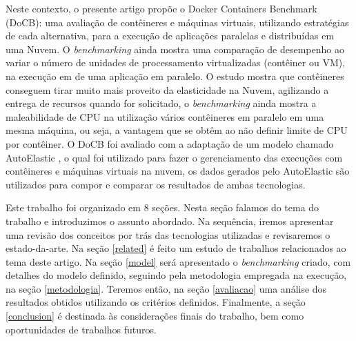 \documentclass[twoside,english,brazilian]{UNISINOSartigo}
\begin{document}

Neste contexto, o presente artigo propõe o Docker Containers Benchmark (DoCB): uma avaliação de contêineres e máquinas virtuais, utilizando estratégias de cada alternativa, para a execução de aplicações paralelas e distribuídas em uma Nuvem. O \textit{benchmarking} ainda mostra uma comparação de desempenho ao variar o número de unidades de processamento virtualizadas (contêiner ou VM), na execução em de uma aplicação em paralelo. O estudo mostra que contêineres conseguem tirar muito mais proveito da elasticidade na Nuvem, agilizando a entrega de recursos quando for solicitado, o \textit{benchmarking} ainda mostra a maleabilidade de CPU na utilização vários contêineres em paralelo em uma mesma máquina, ou seja, a vantagem que se obtêm ao não definir limite de CPU por contêiner. O DoCB foi avaliado com a adaptação de um modelo chamado AutoElastic , o qual foi utilizado para fazer o gerenciamento das execuções com contêineres e máquinas virtuais na nuvem, os dados gerados pelo AutoElastic são utilizados para compor e comparar os resultados de ambas tecnologias. 

Este trabalho foi organizado em 8 seções. Nesta seção falamos do tema do trabalho e introduzimos o assunto abordado. Na sequência, iremos apresentar uma revisão dos conceitos por trás das tecnologias utilizadas e revisaremos o estado-da-arte. Na seção \ref{related} é feito um estudo de trabalhos relacionados ao tema deste artigo. Na seção \ref{model} será apresentado o \textit{benchmarking} criado, com detalhes do modelo definido, seguindo pela metodologia empregada na execução, na seção \ref{metodologia}. Teremos então, na seção \ref{avaliacao} uma análise dos resultados obtidos utilizando os critérios definidos. Finalmente, a seção \ref{conclusion} é destinada às considerações finais do trabalho, bem como oportunidades de trabalhos futuros.
\end{document}
